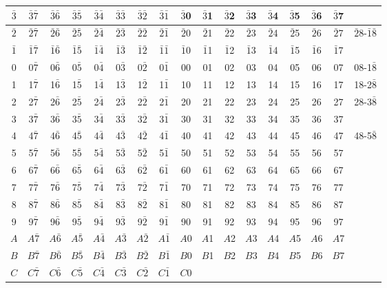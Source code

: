 \documentclass[12 pt]{article}%
\begin{document}
\begin{small}
\begin{tabular}{|c||c|c|c|c|c||c|c|c|c|c||c|c|c|c|c||c|}
    \hline
    $\bar 3$ & $\bar3\bar7$ & $\bar3\bar6$ & $\bar3\bar5$ & $\bar3\bar4$ & $\bar3\bar3$ & $\bar3\bar2$ & $\bar3\bar1$ & $\bar3$0 & $\bar3$1 & $\bar3$2 & $\bar3$3 & $\bar3$4 & $\bar3$5 & $\bar3$6 & $\bar3$7 & \\
    \hline
    $\bar 2$ & $\bar2\bar7$ & $\bar2\bar6$ & $\bar2\bar5$ & $\bar2\bar4$ & $\bar2\bar3$ & $\bar2\bar2$ & $\bar2\bar1$ & $\bar2$0 & $\bar2$1 & $\bar2$2 & $\bar2$3 & $\bar2$4 & $\bar2$5 & $\bar2$6 & $\bar2$7 & $\bar28$-$\bar1\bar8$ \\
    \hline
    $\bar 1$ & $\bar1\bar7$ & $\bar1\bar6$ & $\bar1\bar5$ & $\bar1\bar4$ & $\bar1\bar3$ & $\bar1\bar2$ & $\bar1\bar1$ & $\bar1$0 & $\bar1$1 & $\bar1$2 & $\bar1$3 & $\bar1$4 & $\bar1$5 & $\bar1$6 & $\bar1$7 & \\
    \hline
    0 & 0$\bar7$ & 0$\bar6$ & 0$\bar5$ & 0$\bar4$ & 0$\bar3$ & 0$\bar2$ & 0$\bar1$ & 00 & 01 & 02 & 03 & 04 & 05 & 06 & 07 & 08-1$\bar8$\\
    \hline
    1 & 1$\bar7$ & 1$\bar6$ & 1$\bar5$ & 1$\bar4$ & 1$\bar3$ & 1$\bar2$ & 1$\bar1$ & 10 & 11 & 12 & 13 & 14 & 15 & 16 & 17 & 18-2$\bar8$ \\
    \hline
    2 & 2$\bar7$ & 2$\bar6$ & 2$\bar5$ & 2$\bar4$ & 2$\bar3$ & 2$\bar2$ & 2$\bar1$ & 20 & 21 & 22 & 23 & 24 & 25 & 26 & 27 & 28-3$\bar8$\\
    \hline
    3 & 3$\bar7$ & 3$\bar6$ & 3$\bar5$ & 3$\bar4$ & 3$\bar3$ & 3$\bar2$ & 3$\bar1$ & 30 & 31 & 32 & 33 & 34 & 35 & 36 & 37 & \\
    \hline
    4 & 4$\bar7$ & 4$\bar6$ & 4$\bar5$ & 4$\bar4$ & 4$\bar3$ & 4$\bar2$ & 4$\bar1$ & 40 & 41 & 42 & 43 & 44 & 45 & 46 & 47 & 48-5$\bar8$ \\
    \hline
    5 & 5$\bar7$ & 5$\bar6$ & 5$\bar5$ & 5$\bar4$ & 5$\bar3$ & 5$\bar2$ & 5$\bar1$ & 50 & 51 & 52 & 53 & 54 & 55 & 56 & 57 & \\
    \hline
    6 & 6$\bar7$ & 6$\bar6$ & 6$\bar5$ & 6$\bar4$ & 6$\bar3$ & 6$\bar2$ & 6$\bar1$ & 60 & 61 & 62 & 63 & 64 & 65 & 66 & 67 & \\
    \hline
    7 & 7$\bar7$ & 7$\bar6$ & 7$\bar5$ & 7$\bar4$ & 7$\bar3$ & 7$\bar2$ & 7$\bar1$ & 70 & 71 & 72 & 73 & 74 & 75 & 76 & 77 & \\
    \hline
    8 & 8$\bar7$ & 8$\bar6$ & 8$\bar5$ & 8$\bar4$ & 8$\bar3$ & 8$\bar2$ & 8$\bar1$ & 80 & 81 & 82 & 83 & 84 & 85 & 86 & 87 & \\
    \hline
    9 & 9$\bar7$ & 9$\bar6$ & 9$\bar5$ & 9$\bar4$ & 9$\bar3$ & 9$\bar2$ & 9$\bar1$ & 90 & 91 & 92 & 93 & 94 & 95 & 96 & 97 & \\
    \hline
    $A$ & $A\bar7$ & $A\bar6$ & $A\bar5$ & $A\bar4$ & $A\bar3$ & $A\bar2$ & $A\bar1$ & $A$0 & $A$1 & $A$2 & $A$3 & $A$4 & $A$5 & $A$6 & $A$7 & \\
    \hline
    $B$ & $B\bar7$ & $B\bar6$ & $B\bar5$ & $B\bar4$ & $B\bar3$ & $B\bar2$ & $B\bar1$ & $B$0 & $B$1 & $B$2 & $B$3 & $B$4 & $B$5 & $B$6 & $B$7 & \\
    \hline
    $C$ & $C\bar7$ & $C\bar6$ & $C\bar5$ & $C\bar4$ & $C\bar3$ & $C\bar2$ & $C\bar1$ & $C$0 & & & & & & & & \\
    \hline
  \end{tabular}
\end{small}
\end{document}
